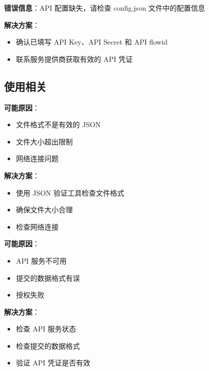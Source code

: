 \documentclass[a4paper, 12pt]{article}
\begin{document}
\begin{tcolorbox}[colback=red!5,colframe=red!40,title=问题：API 配置缺失]
\textbf{错误信息}：API 配置缺失，请检查 config.json 文件中的配置信息

\textbf{解决方案}：
\begin{itemize}
    \item 确认已填写 API Key、API Secret 和 API flowid
    \item 联系服务提供商获取有效的 API 凭证
\end{itemize}
\end{tcolorbox}

\subsection{使用相关}
\begin{tcolorbox}[colback=yellow!5,colframe=yellow!40,title=问题：文件上传失败]
\textbf{可能原因}：
\begin{itemize}
    \item 文件格式不是有效的 JSON
    \item 文件大小超出限制
    \item 网络连接问题
\end{itemize}

\textbf{解决方案}：
\begin{itemize}
    \item 使用 JSON 验证工具检查文件格式
    \item 确保文件大小合理
    \item 检查网络连接
\end{itemize}
\end{tcolorbox}

\begin{tcolorbox}[colback=yellow!5,colframe=yellow!40,title=问题：新闻稿生成失败]
\textbf{可能原因}：
\begin{itemize}
    \item API 服务不可用
    \item 提交的数据格式有误
    \item 授权失败
\end{itemize}

\textbf{解决方案}：
\begin{itemize}
    \item 检查 API 服务状态
    \item 检查提交的数据格式
    \item 验证 API 凭证是否有效
\end{itemize}
\end{tcolorbox}
\end{document}
